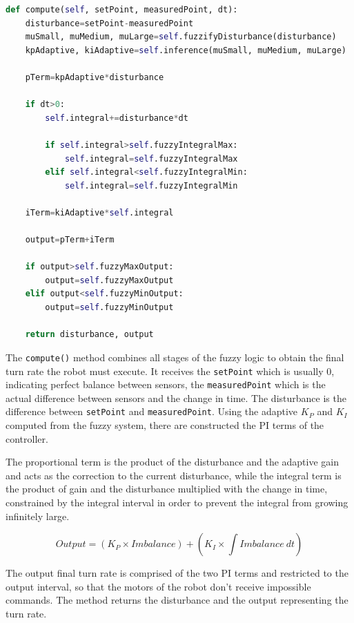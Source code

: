 \begin{lstlisting}[language=Python, caption={FuzzyPIAlgorithm output computing}, label={lst:lk-init}]
def compute(self, setPoint, measuredPoint, dt):
    disturbance=setPoint-measuredPoint
    muSmall, muMedium, muLarge=self.fuzzifyDisturbance(disturbance)
    kpAdaptive, kiAdaptive=self.inference(muSmall, muMedium, muLarge)
    
    pTerm=kpAdaptive*disturbance
    
    if dt>0:
        self.integral+=disturbance*dt
        
        if self.integral>self.fuzzyIntegralMax:
            self.integral=self.fuzzyIntegralMax
        elif self.integral<self.fuzzyIntegralMin:
            self.integral=self.fuzzyIntegralMin
            
    iTerm=kiAdaptive*self.integral
    
    output=pTerm+iTerm
    
    if output>self.fuzzyMaxOutput:
        output=self.fuzzyMaxOutput
    elif output<self.fuzzyMinOutput:
        output=self.fuzzyMinOutput
        
    return disturbance, output
\end{lstlisting}

The \texttt{compute()} method combines all stages of the fuzzy logic to obtain the final turn rate the robot must execute. It receives the \texttt{setPoint} which is usually 0, indicating perfect balance between sensors, the \texttt{measuredPoint} which is the actual difference between sensors and the change in time. The disturbance is the difference between \texttt{setPoint} and \texttt{measuredPoint}. Using the adaptive $K_P$ and $K_I$ computed from the fuzzy system, there are constructed the PI terms of the controller.

The proportional term is the product of the disturbance and the adaptive gain and acts as the correction to the current disturbance, while the integral term is the product of gain and the disturbance multiplied with the change in time, constrained by the integral interval in order to prevent the integral from growing infinitely large.

\begin{equation}
    Output=(K_P\times Imbalance)+(K_I\times\int Imbalance\ dt)
    \label{eq:kp-mult}
\end{equation}

The output final turn rate is comprised of the two PI terms and restricted to the output interval, so that the motors of the robot don’t receive impossible commands. The method returns the disturbance and the output representing the turn rate.


